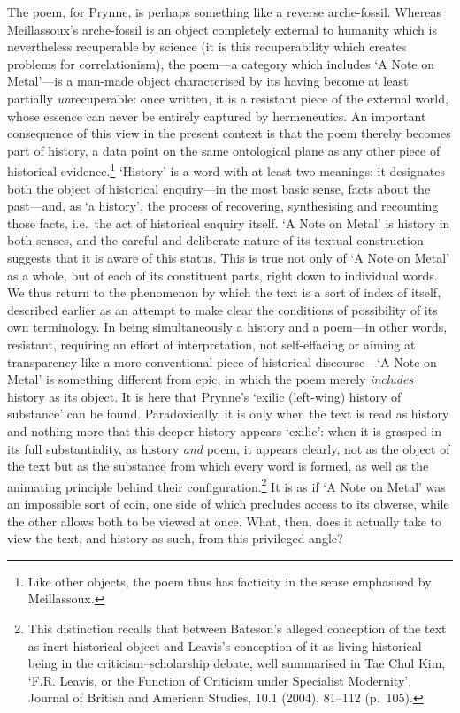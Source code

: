 \documentclass[]{article}
\begin{document}
The poem, for Prynne, is perhaps something like a reverse arche-fossil.
Whereas Meillassoux’s arche-fossil is an object completely external to
humanity which is nevertheless recuperable by science (it is this
recuperability which creates problems for correlationism), the poem—a
category which includes ‘A Note on Metal’—is a man-made object
characterised by its having become at least partially
\emph{un}recuperable: once written, it is a resistant piece of the
external world, whose essence can never be entirely captured by
hermeneutics. An important consequence of this view in the present
context is that the poem thereby becomes part of history, a data point
on the same ontological plane as any other piece of historical
evidence.\footnote{Like other objects, the poem thus has facticity in
  the sense emphasised by Meillassoux.} ‘History’ is a word with at
least two meanings: it designates both the object of historical
enquiry—in the most basic sense, facts about the past—and, as ‘a
history’, the process of recovering, synthesising and recounting those
facts, i.e.~the act of historical enquiry itself. ‘A Note on Metal’ is
history in both senses, and the careful and deliberate nature of its
textual construction suggests that it is aware of this status. This is
true not only of ‘A Note on Metal’ as a whole, but of each of its
constituent parts, right down to individual words. We thus return to the
phenomenon by which the text is a sort of index of itself, described
earlier as an attempt to make clear the conditions of possibility of its
own terminology. In being simultaneously a history and a poem—in other
words, resistant, requiring an effort of interpretation, not
self-effacing or aiming at transparency like a more conventional piece
of historical discourse—‘A Note on Metal’ is something different from
epic, in which the poem merely \emph{includes} history as its object. It
is here that Prynne’s ‘exilic (left-wing) history of substance’ can be
found. Paradoxically, it is only when the text is read as history and
nothing more that this deeper history appears ‘exilic’: when it is
grasped in its full substantiality, as history \emph{and} poem, it
appears clearly, not as the object of the text but as the substance from
which every word is formed, as well as the animating principle behind
their configuration.\footnote{This distinction recalls that between
  Bateson’s alleged conception of the text as inert historical object
  and Leavis’s conception of it as living historical being in the
  criticism–scholarship debate, well summarised in Tae Chul Kim, ‘F.R.
  Leavis, or the Function of Criticism under Specialist Modernity’,
  Journal of British and American Studies, 10.1 (2004), 81–112 (p.~105).}
It is as if ‘A Note on Metal’ was an impossible sort of coin, one side
of which precludes access to its obverse, while the other allows both to
be viewed at once. What, then, does it actually take to view the text,
and history as such, from this privileged angle?
\end{document}

